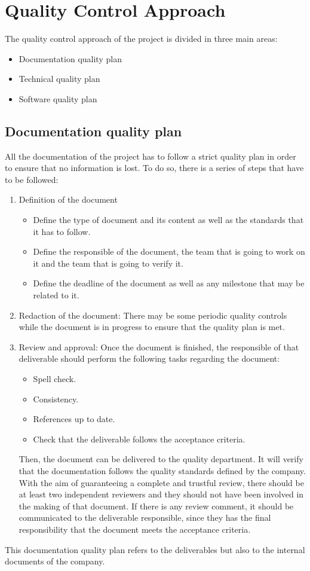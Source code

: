 \section{Quality Control Approach}

The quality control approach of the project is divided in three main areas:
\begin{itemize}
	\item Documentation quality plan
	\item Technical quality plan
	\item Software quality plan
\end{itemize}

\subsection{Documentation quality plan}
All the documentation of the project has to follow a strict quality plan in order to ensure that no information is lost. To do so, there is a series of steps that have to be followed:
\begin{enumerate}
	\item Definition of the document
	\begin{itemize}
		\item Define the type of document and its content as well as the standards that it has to follow.
		\item Define the responsible of the document, the team that is going to work on it and the team that is going to verify it.
		\item Define the deadline of the document as well as any milestone that may be related to it.
	\end{itemize}
	\item Redaction of the document: There may be some periodic quality controls while the document is in progress to ensure that the quality plan is met.
	\item Review and approval: Once the document is finished, the responsible of that deliverable should perform the following tasks regarding the document:
	\begin{itemize}
		\item Spell check.
		\item Consistency.
		\item References up to date.
		\item Check that the deliverable follows the acceptance criteria.
	\end{itemize}
	Then, the document can be delivered to the quality department. It will verify that the documentation follows the quality standards defined by the company. With the aim of guaranteeing a complete and trustful review, there should be at least two independent reviewers and they should not have been involved in the making of that document.
	If there is any review comment, it should be communicated to the deliverable responsible, since they has the final responsibility that the document meets the acceptance criteria.
\end{enumerate}
This documentation quality plan refers to the deliverables but also to the internal documents of the company.

